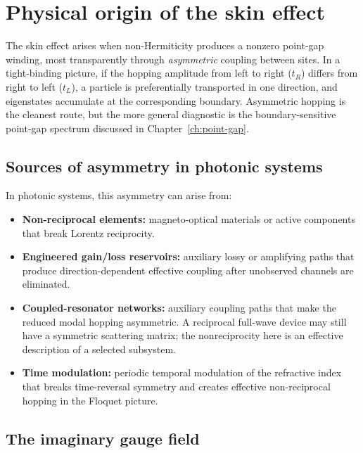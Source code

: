 \section{Physical origin of the skin effect}
\label{sec:skin-origin}

The skin effect arises when non-Hermiticity produces a nonzero
point-gap winding, most transparently through \emph{asymmetric} coupling
between sites. In a tight-binding picture, if the hopping amplitude from
left to right ($t_R$) differs from right to left ($t_L$), a particle is
preferentially transported in one direction, and eigenstates accumulate
at the corresponding boundary. Asymmetric hopping is the cleanest route,
but the more general diagnostic is the boundary-sensitive point-gap
spectrum discussed in Chapter~\ref{ch:point-gap}.

\subsection{Sources of asymmetry in photonic systems}
\label{ssec:asymmetry-sources}

In photonic systems, this asymmetry can arise from:
\begin{itemize}
 \item \textbf{Non-reciprocal elements:} magneto-optical materials or
 active components that break Lorentz reciprocity.
 \item \textbf{Engineered gain/loss reservoirs:} auxiliary lossy or
 amplifying paths that produce direction-dependent effective coupling
 after unobserved channels are eliminated.
 \item \textbf{Coupled-resonator networks:} auxiliary coupling paths
 that make the reduced modal hopping asymmetric. A reciprocal
 full-wave device may still have a symmetric scattering matrix; the
 nonreciprocity here is an effective description of a selected
 subsystem.
 \item \textbf{Time modulation:} periodic temporal modulation of the
 refractive index that breaks time-reversal symmetry and creates
 effective non-reciprocal hopping in the Floquet picture.
\end{itemize}

\subsection{The imaginary gauge field}
\label{ssec:imaginary-gauge}

